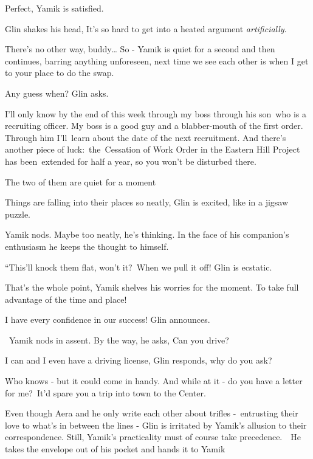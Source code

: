 \documentclass[twoside,11pt]{book}
\begin{document}
{\textquotedbl}Perfect,{\textquotedbl} Yamik is satisfied. 

Glin shakes his head, {\textquotedbl}It's so hard to get into a heated argument \textit{artificially}.{\textquotedbl} 

{\textquotedbl}There's no other way, buddy{\dots} So -{\textquotedbl} Yamik is quiet for a second and then continues,
{\textquotedbl}barring anything unforeseen, next time we see each other is when I get to your place to do the
swap.{\textquotedbl} 

{\textquotedbl}Any guess when?{\textquotedbl} Glin asks. 

{\textquotedbl}I'll only know by the end of this week through my boss through his son\ who is a recruiting officer. My
boss is a good guy and a blabber-mouth of the first order. Through him I'll\ learn about the date of the next
recruitment. And there's another piece of luck:\ the\ Cessation of Work Order in the Eastern Hill Project has
been~extended for half a year, so you won't be disturbed there.{\textquotedbl}\ 

The two of them are quiet for a moment

{\textquotedbl}Things are falling into their places so neatly,{\textquotedbl} Glin is excited, {\textquotedbl}like in a
jigsaw puzzle.{\textquotedbl}

Yamik nods. Maybe too neatly, he's thinking. In the face of his companion's enthusiasm he keeps the thought to himself.

{}``This'll knock them flat, won't it?\ When we pull it off!{\textquotedbl} Glin is ecstatic.\ 

{\textquotedbl}That's the whole point,{\textquotedbl} Yamik shelves his worries for the moment. {\textquotedbl}To take
full advantage of the time and place!{\textquotedbl}

{\textquotedbl}I have every confidence in our success!{\textquotedbl} Glin announces.

~Yamik nods in assent. {\textquotedbl}By the way,{\textquotedbl} he asks, {\textquotedbl}Can you drive?{\textquotedbl}

{\textquotedbl}I can and I even have a driving license,{\textquotedbl} Glin responds, {\textquotedbl}why do you
ask?{\textquotedbl}

{\textquotedbl}Who knows - but it could come in handy. And while at it - do you have a letter for me?\ It'd spare you a
trip into town to the Center.{\textquotedbl}\ 

Even though Aera and he only write each other about trifles -\ entrusting their love to what's in between the lines -
Glin is irritated by Yamik's allusion to their correspondence. Still, Yamik's practicality must of course take
precedence.\ \ He takes the envelope out of his pocket and hands it to Yamik ~ 
\end{document}

